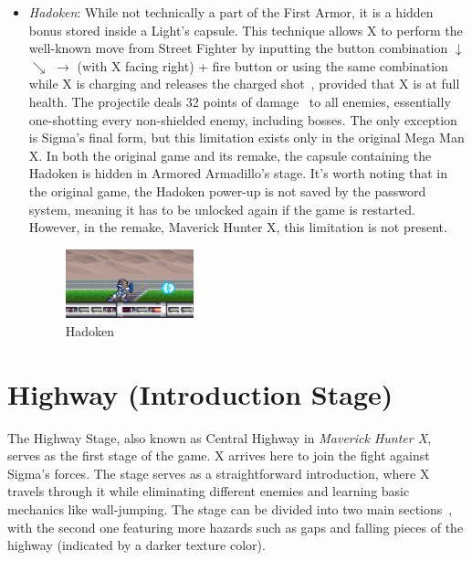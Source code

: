\begin{itemize}
\item \emph{Hadoken}: While not technically a part of the First Armor, it is a hidden bonus stored inside a Light's capsule. This technique allows X to perform the well-known move from Street Fighter by inputting the button combination $\downarrow$ $\searrow$ $\rightarrow$ (with X facing right) + fire button or using the same combination while X is charging and releases the charged shot~\cite{RTA_wiki:X1}, provided that X is at full health. The projectile deals 32 points of damage~\cite{wiki:Hadoken} to all enemies, essentially one-shotting every non-shielded enemy, including bosses. The only exception is Sigma's final form, but this limitation exists only in the original Mega Man X. In both the original game and its remake, the capsule containing the Hadoken is hidden in Armored Armadillo's stage. It's worth noting that in the original game, the Hadoken power-up is not saved by the password system, meaning it has to be unlocked again if the game is restarted. However, in the remake, Maverick Hunter X, this limitation is not present.
\begin{figure}[htp]
	\centering
	\includegraphics[height=2cm]{figures/X1/weapons/Hadoken.jpg}
	\caption{Hadoken}
\end{figure}

\end{itemize}


\section{Highway (Introduction Stage)}

The Highway Stage, also known as Central Highway in \textit{Maverick Hunter X}, serves as the first stage of the game. X arrives here to join the fight against Sigma's forces. The stage serves as a straightforward introduction, where X travels through it while eliminating different enemies and learning basic mechanics like wall-jumping. The stage can be divided into two main sections~\cite{stratwiki:HighWay}, with the second one featuring more hazards such as gaps and falling pieces of the highway (indicated by a darker texture color).

